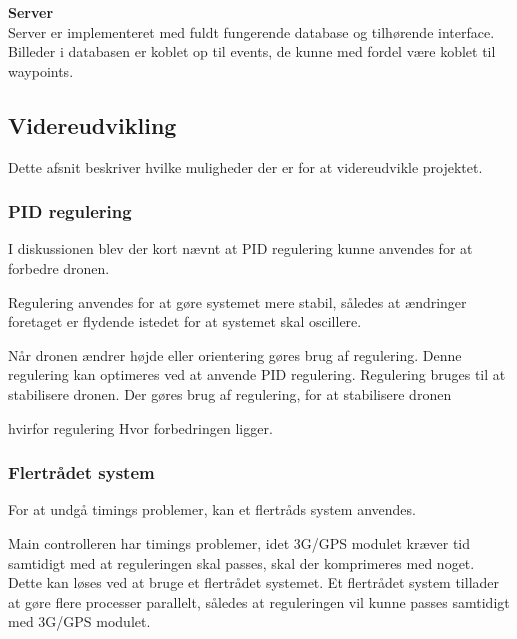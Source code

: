 \textbf{Server}\\
Server er implementeret med fuldt fungerende database og tilhørende interface. Billeder i databasen er koblet op til events, de kunne med fordel være koblet til waypoints.


\subsection{Videreudvikling}

Dette afsnit beskriver hvilke muligheder der er for at videreudvikle projektet. 

\subsubsection*{PID regulering}
I diskussionen blev der kort nævnt at PID regulering kunne anvendes for at forbedre dronen. 



Regulering anvendes for at gøre systemet mere stabil, således at ændringer foretaget er flydende istedet for at systemet skal oscillere.

Når dronen ændrer højde eller orientering gøres brug af regulering. Denne regulering kan optimeres ved at anvende PID regulering. 
Regulering bruges til at stabilisere dronen. 
Der gøres brug af regulering, for at stabilisere dronen

hvirfor regulering
Hvor forbedringen ligger.

\subsubsection*{Flertrådet system}
For at undgå timings problemer, kan et flertråds system anvendes. 

Main controlleren har timings problemer, idet 3G/GPS modulet kræver tid samtidigt med at reguleringen skal passes, skal der komprimeres med noget. Dette kan løses ved at bruge et flertrådet systemet. Et flertrådet system tillader at gøre flere processer parallelt, således at reguleringen vil kunne passes samtidigt med 3G/GPS modulet.
